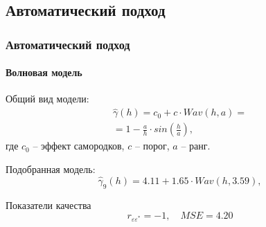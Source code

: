 \documentclass{beamer}
\begin{document}
\subsection{Автоматический подход}
\begin{frame}
  \frametitle{Автоматический подход}
  \framesubtitle{Волновая модель}
  \begin{multicols}{2}
    \begin{small}
      Общий вид модели:
      \begin{eqnarray}
      \label{eq:wave}
        \widehat{\gamma}(h) = c_0 + c \cdot Wav(h, a) = \\ = 1 - \frac{a}{h} \cdot sin(\frac{h}{a}), \nonumber
      \end{eqnarray}
      где $ c_0 $ -- эффект самородков, $ c $ -- порог, $ a $ -- ранг.
      
      \medskip
      
      Подобранная модель:
      \begin{equation}
      \label{eq:gamma9}
        \widehat{\gamma}_9(h) = 4.11 + 1.65 \cdot Wav(h, 3.59),
      \end{equation}
      
      Показатели качества
      \begin{equation*}
        r_{\varepsilon\varepsilon^{*}} = -1, \quad MSE = 4.20
      \end{equation*}
    \end{small}
    

\end{multicols}
\end{frame}
\end{document}
